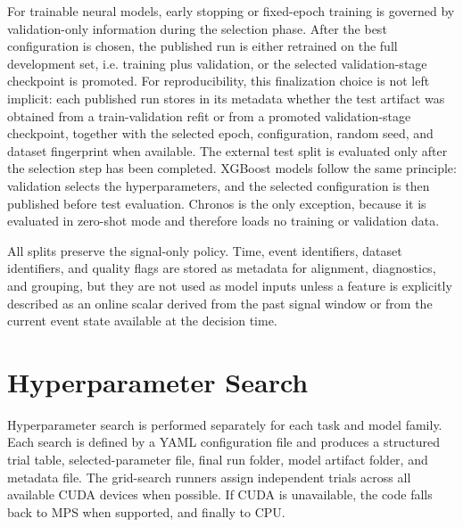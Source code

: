 For trainable neural models, early stopping or fixed-epoch training is governed
by validation-only information during the selection phase. After the best
configuration is chosen, the published run is either retrained on the full
development set, i.e. training plus validation, or the selected validation-stage
checkpoint is promoted. For reproducibility, this finalization choice is not
left implicit: each published run stores in its metadata whether the test
artifact was obtained from a train-validation refit or from a promoted
validation-stage checkpoint, together with the selected epoch, configuration,
random seed, and dataset fingerprint when available. The external test split is
evaluated only after the selection step has been completed. XGBoost models
follow the same principle: validation selects the hyperparameters, and the
selected configuration is then published before test evaluation. Chronos is the
only exception, because it is evaluated in zero-shot mode and therefore loads no
training or validation data.

All splits preserve the signal-only policy. Time, event identifiers, dataset
identifiers, and quality flags are stored as metadata for alignment,
diagnostics, and grouping, but they are not used as model inputs unless a
feature is explicitly described as an online scalar derived from the past signal
window or from the current event state available at the decision time.

\section{Hyperparameter Search}
\label{sec:hyperparameter-search}

Hyperparameter search is performed separately for each task and model family.
Each search is defined by a YAML configuration file and produces a structured
trial table, selected-parameter file, final run folder, model artifact folder,
and metadata file. The grid-search runners assign independent trials across all
available CUDA devices when possible. If CUDA is unavailable, the code falls
back to MPS when supported, and finally to CPU.

